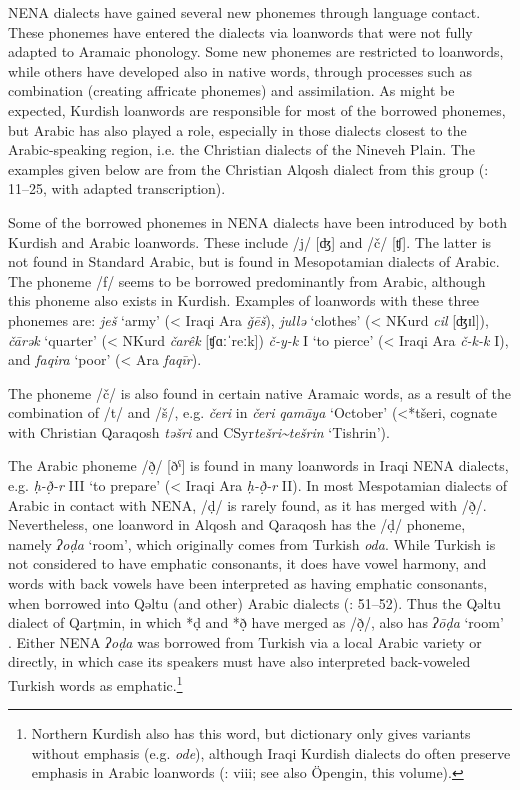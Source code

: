 \documentclass[output=paper]{langsci/langscibook}
\begin{document}
NENA dialects have gained several new phonemes through language contact. These phonemes have entered the dialects via loanwords that were not fully adapted to Aramaic phonology. Some new phonemes are restricted to loanwords, while others have developed also in native words, through processes such as combination (creating affricate phonemes) and assimilation. As might be expected, Kurdish loanwords are responsible for most of the borrowed phonemes, but Arabic has also played a role, especially in those dialects closest to the Arabic-speaking region, i.e. the Christian dialects of the Nineveh Plain. The examples given below are from the Christian Alqosh dialect from this group (\citealt{Coghill2004}: 11–25, with adapted transcription).

Some of the borrowed phonemes in NENA dialects have been introduced by both Kurdish and Arabic loanwords. These include /j/ [ʤ] and /č/ [ʧ]. The latter is not found in Standard Arabic, but is found in Mesopotamian dialects of Arabic. The phoneme /f/ seems to be borrowed predominantly from Arabic, although this phoneme also exists in Kurdish. Examples of loanwords with these three phonemes are: \textit{ješ} ‘army’ (< Iraqi Ara \textit{ǧēš}), \textit{jullə} ‘clothes’ (< NKurd \textit{cil} [ʤɪl]), \textit{čārək} ‘quarter’ (< NKurd \textit{čarêk} [ʧɑːˈreːk]) \textit{č-y-k} I ‘to pierce’ (< Iraqi Ara \textit{č-k-k} I), and \textit{faqira} ‘poor’ (< Ara \textit{faqīr}).

The phoneme /č/ is also found in certain native Aramaic words, as a result of the combination of /t/ and /š/, e.g. \textit{čeri} in \textit{čeri} \textit{qamāya} ‘October’ (<*tšeri, cognate with Christian Qaraqosh \textit{təšri} and CSyr\textit{tešri{\textasciitilde}tešrin} ‘Tishrin’).

The Arabic phoneme /ð̣/ [ðˁ] is found in many loanwords in Iraqi NENA dialects, e.g. \textit{ḥ\nobreakdash-ð̣\nobreakdash-r} III ‘to prepare’ (< Iraqi Ara \textit{ḥ\nobreakdash-ð̣\nobreakdash-r} II). In most Mespotamian dialects of Arabic in contact with NENA, /ḍ/ is rarely found, as it has merged with /ð̣/. Nevertheless, one loanword in Alqosh and Qaraqosh has the /ḍ/ phoneme, namely \textit{ʔoḍa} ‘room’, which originally comes from Turkish \textit{oda}. While Turkish is not considered to have emphatic consonants, it does have vowel harmony, and words with back vowels have been interpreted as having emphatic consonants, when borrowed into Qəltu (and other) Arabic dialects (\citealt{Jastrow1978}: 51–52). Thus the Qəltu dialect of Qarṭmin, in which *ḍ and *ð̣ have merged as /ð̣/, also has \textit{ʔōḍa} ‘room’ \citep[70]{Jastrow1978}. Either NENA \textit{ʔoḍa} was borrowed from Turkish via a local Arabic variety or directly, in which case its speakers must have also interpreted back-voweled Turkish words as emphatic.\footnote{Northern Kurdish also has this word, but  dictionary only gives variants without emphasis (e.g. \textit{ode}), although Iraqi Kurdish dialects do often preserve emphasis in Arabic loanwords (\citealt{Chyet2003}: viii; see also Öpengin, this volume).}
\end{document}
